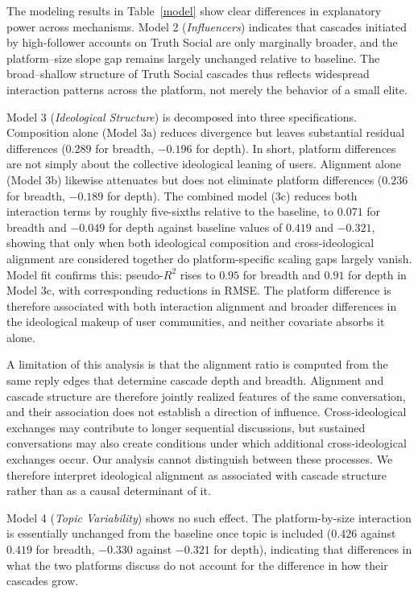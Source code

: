 \documentclass[letterpaper]{article} %
\newcommand{\rev}[1]{{\color{blue}#1}}
\begin{document}
The modeling results in Table~\ref{model} show clear differences in explanatory power across mechanisms. Model 2 (\textit{Influencers}) indicates that cascades initiated by high-follower accounts on Truth Social are only marginally broader, and the platform--size slope gap remains largely unchanged relative to baseline. The broad--shallow structure of Truth Social cascades thus reflects widespread interaction patterns across the platform, not merely the behavior of a small elite.

Model 3 (\textit{Ideological Structure}) is decomposed into three specifications. Composition alone (Model 3a) reduces divergence but leaves substantial residual differences \rev{($0.289$ for breadth, $-0.196$ for depth)}. In short, platform differences are not simply about the collective ideological leaning of users. Alignment alone (Model 3b) likewise attenuates but does not eliminate platform differences \rev{($0.236$ for breadth, $-0.189$ for depth)}. The combined model (3c) \rev{reduces both interaction terms by roughly five-sixths relative to the baseline, to $0.071$ for breadth and $-0.049$ for depth against baseline values of $0.419$ and $-0.321$}, showing that only when both ideological composition and cross-ideological alignment are considered together do platform-specific scaling gaps largely vanish. Model fit confirms this: pseudo-$R^2$ rises to \rev{$0.95$ for breadth and $0.91$ for depth} in Model 3c, with corresponding reductions in RMSE. \rev{The platform difference is therefore associated with both interaction alignment and broader differences in the ideological makeup of user communities, and neither covariate absorbs it alone.}

\rev{A limitation of this analysis is that the alignment ratio is computed from the same reply edges that determine cascade depth and breadth. Alignment and cascade structure are therefore jointly realized features of the same conversation, and their association does not establish a direction of influence. Cross-ideological exchanges may contribute to longer sequential discussions, but sustained conversations may also create conditions under which additional cross-ideological exchanges occur. Our analysis cannot distinguish between these processes. We therefore interpret ideological alignment as associated with cascade structure rather than as a causal determinant of it.}

Model 4 (\textit{Topic Variability}) shows \rev{no such effect. The platform-by-size interaction is essentially unchanged from the baseline once topic is included ($0.426$ against $0.419$ for breadth, $-0.330$ against $-0.321$ for depth), indicating that differences in what the two platforms discuss do not account for the difference in how their cascades grow.}
\end{document}

